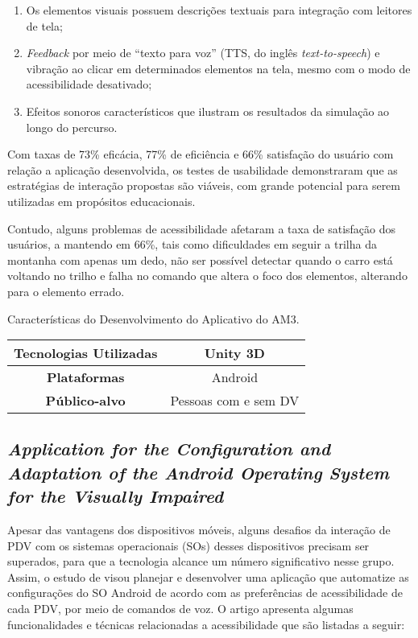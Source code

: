 \begin{enumerate}
  \item Os elementos visuais possuem descrições textuais para integração com leitores de tela;
  \item \emph{Feedback} por meio de ``texto para voz'' (TTS, do inglês \emph{text-to-speech}) e vibração ao clicar em determinados elementos
        na tela, mesmo com o modo de acessibilidade desativado;
  \item Efeitos sonoros característicos que ilustram os resultados da simulação ao longo do percurso.
\end{enumerate}

Com taxas de 73\% eficácia, 77\% de eficiência e 66\% satisfação do usuário com relação a aplicação desenvolvida, os testes de usabilidade
demonstraram que as estratégias de interação propostas são viáveis, com grande potencial para serem utilizadas em propósitos educacionais.

Contudo, alguns problemas de acessibilidade afetaram a taxa de satisfação dos usuários, a mantendo em 66\%, tais como
dificuldades em seguir a trilha da montanha com apenas um dedo, não ser possível detectar quando o carro está voltando
no trilho e falha no comando que altera o foco dos elementos, alterando para o elemento errado.

\begin{quadro}[htb!]
  \caption{\label{qua-car-am3}Características do Desenvolvimento do Aplicativo do AM3.}
  \begin{tabular}{|c|c|}
    \hline
    \textbf{Tecnologias Utilizadas} & Unity 3D             \\ \hline
    \textbf{Plataformas}            & Android              \\ \hline
    \textbf{Público-alvo}           & Pessoas com e sem DV \\
    \hline
  \end{tabular}
\end{quadro}

\subsection{\emph{Application for the Configuration and Adaptation of the Android Operating System for the Visually Impaired}}

Apesar das vantagens dos dispositivos móveis, alguns desafios da interação de PDV com os sistemas operacionais (SOs) desses dispositivos precisam ser superados, para que a tecnologia alcance
um número significativo nesse grupo. Assim, o estudo de  visou planejar e desenvolver uma aplicação que automatize as configurações do SO Android de acordo com
as preferências de acessibilidade de cada PDV, por meio de comandos de voz. O artigo apresenta algumas funcionalidades e técnicas relacionadas a acessibilidade que são listadas a seguir:

